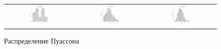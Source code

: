 \documentclass[a4paper,14pt]{article}
\begin{document}
	\begin{figure}[H]
		\centering
		\begin{tabular}{c c c}
			\includegraphics[height = 0.25\textheight, width = 0.31\textwidth]{./lab1_1/pictures/ n = 10 poisson distribution.png}
			& \includegraphics[height = 0.25\textheight, width = 0.31\textwidth]{./lab1_1/pictures/ n = 100 poisson distribution.png}
			& \includegraphics[height = 0.25\textheight, width = 0.31\textwidth]{./lab1_1/pictures/ n = 1000 poisson distribution.png}
		\end{tabular}
		\caption{Распределение Пуассона}
	\end{figure}
	
\end{document}
